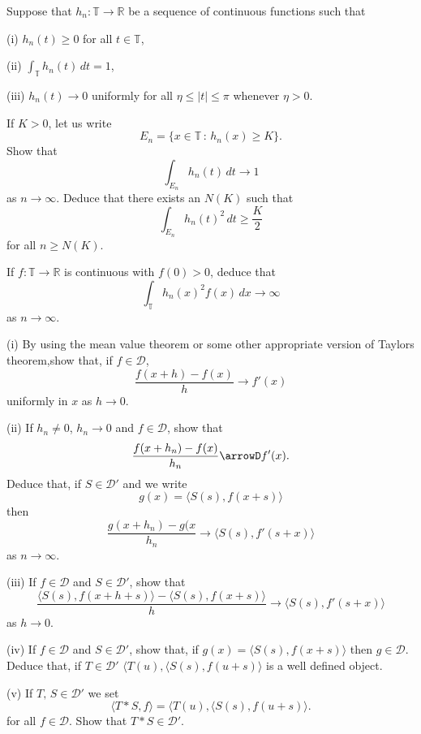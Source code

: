 \begin{question}\label{explosion}
Suppose that $h_{n}:{\mathbb T}\rightarrow{\mathbb R}$
be a sequence of continuous functions such that

(i) $h_{n}(t)\geq 0$ for all $t\in{\mathbb T}$,

(ii) ${\displaystyle \int_{\mathbb T}h_{n}(t)\,dt=1}$,

(iii) $h_{n}(t)\rightarrow 0$ uniformly for all $\eta\leq |t|\leq \pi$
whenever $\eta>0$.

\noindent If $K>0$, let us write
\[E_{n}=\{x\in {\mathbb T}\,:\,h_{n}(x)\geq K\}.\]
Show that
\[\int_{E_{n}}h_{n}(t)\,dt\rightarrow 1\]
as $n\rightarrow\infty$. Deduce that there exists an $N(K)$ such that
\[\int_{E_{n}}h_{n}(t)^{2}\,dt\geq \frac{K}{2}\]
for all $n\geq N(K)$.

If $f:{\mathbb T}\rightarrow{\mathbb R}$ is continuous
with $f(0)>0$, deduce that
\[\int_{\mathbb T}h_{n}(x)^{2}f(x)\,dx\rightarrow\infty\]
as $n\rightarrow \infty$.
\end{question}

\begin{question}\label{work convolution}
(i) By using the mean value theorem
or some other appropriate version of Taylors theorem,show that,
if $f\in{\mathcal D}$,
\[\frac{f(x+h)-f(x)}{h}\rightarrow f'(x)\]
uniformly in $x$ as $h\rightarrow 0$.

(ii) If $h_{n}\neq 0$, $h_{n}\rightarrow 0$ and
$f\in{\mathcal D}$, show that
\[\frac{f(x+h_{n})-f(x)}{h_{n}}\arrowD f'(x).\]
Deduce that, if $S\in{\mathcal D}'$ and we write
\[g(x)=\langle S(s),f(x+s)\rangle\]
then
\[\frac{g(x+h_{n})-g(x}{h_{n}}\rightarrow\langle S(s),f'(s+x)\rangle\]
as $n\rightarrow\infty$.

(iii) If $f\in{\mathcal D}$ and $S\in{\mathcal D}'$,
show that
\[\frac{\langle S(s),f(x+h+s)\rangle-\langle S(s),f(x+s)\rangle}{h}
\rightarrow \langle S(s),f'(s+x)\rangle\]
as $h\rightarrow 0$.

(iv) If $f\in{\mathcal D}$ and $S\in{\mathcal D}'$,
show that, if $g(x)=\langle S(s),f(x+s)\rangle$
then $g\in{\mathcal D}$. Deduce that, if $T\in{\mathcal D}'$
$\langle T(u),\langle S(s),f(u+s)\rangle$
is a well defined object.

(v) If $T,\,S\in{\mathcal D}'$
we set
\[\langle T*S,f\rangle=\langle T(u),\langle S(s),f(u+s)\rangle.\]
for all $f\in {\mathcal D}$. Show that $T*S\in{\mathcal D}'$.
\end{question}

